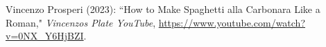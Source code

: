 \begin{thebibliography}{100}
 Vincenzo Prosperi (2023): ``How to Make Spaghetti alla Carbonara Like a Roman," \emph{Vincenzos Plate YouTube}, \url{https://www.youtube.com/watch?v=0NX\_Y6HjBZI}.
\end{thebibliography}